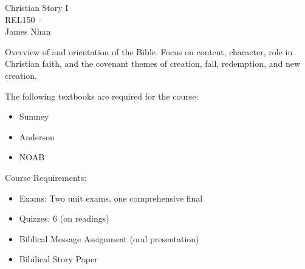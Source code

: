 \documentclass{article}
\begin{document}
\begin{titlepage}
\begin{center}
    {\large Christian Story I} \\
    REL150 \texttt{-} \longdate{\today} \\
    James Nhan
\end{center}
\end{titlepage}

Overview of and orientation of the Bible. Focus on content, character, role in Christian faith, and the covenant themes of creation, fall, redemption, and new creation.
\vspace{10pt}

\noindent The following textbooks are required for the course:

\begin{itemize}
    \item Sumney
    \item Anderson
    \item NOAB
\end{itemize}

\noindent Course Requirements:

\begin{itemize}
    \item Exams: Two unit exams, one comprehensive final
    \item Quizzes: 6 (on readings)
    \item Biblical Message Assignment (oral presentation)
    \item Bibilical Story Paper
\end{itemize}
\end{document}
